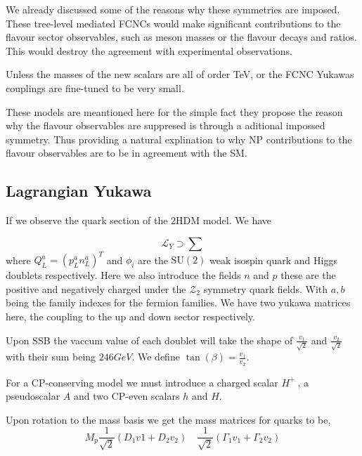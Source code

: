 We already discussed some of the reasons why these symmetries are imposed. These tree-level mediated FCNCs would make significant contributions to the flavour sector observables, such as meson masses or the flavour decays and ratios. This would destroy the agreement with experimental observations. 

Unless the masses of the new scalars are all of order TeV, or the FCNC Yukawas couplings are fine-tuned to be very small. 

These models are meantioned here for the simple fact they propose the reason why the flavour observables are suppresed is through a aditional impossed symmetry. Thus providing a natural explination to why NP contributions to the flavour observables are to be in agreement with the SM. 

\subsection{Lagrangian Yukawa}

If we observe the quark section of the 2HDM model. We have 

\begin{equation}
\mathcal{L}_Y \supset \sum
\end{equation}
where $Q^a_L = \left( p^a_L n^a_L \right)^T$ and $\phi_i$ are the $\mathrm{SU(2)}$ weak isospin quark and Higgs doublets respectively. Here we also introduce the fields $n$ and $p$ these are the positive and negatively charged  under the $\mathcal{Z}_2$ symmetry quark fields. With $a,b$ being the family indexes for the fermion families. We have two yukawa matrices here, the coupling to the up and down sector respectively. 

Upon SSB the vaccum value of each doublet will take the shape of $\frac{v_1}{\sqrt{2}}$ and $\frac{v_2}{\sqrt{2}}$ with their sum being $246 GeV$. We define $\tan(\beta)=\frac{v_1}{v_2}$.

For a CP-conserving model we must introduce a charged scalar $H^+~$, a pseudoscalar $A$ and two CP-even scalars $h$ and $H$.  

Upon rotation to the mass basis we get the mass matrices for quarks to be, 
\begin{equation}
M_p \frac{1}{\sqrt{2}} \left( D_1 v1 + D_2 v_2 \right) \quad \frac{1}{\sqrt{2}}\left( \Gamma_1 v_1 + \Gamma_2 v_2 \right)   
\end{equation}

